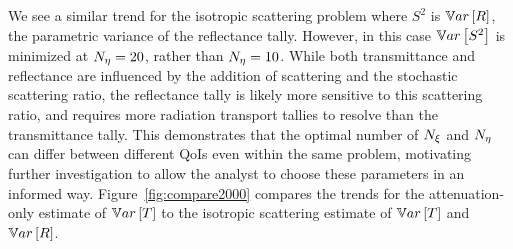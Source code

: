 We see a similar trend for the isotropic scattering problem where $S^2$ is $\mathbb{V}ar\left[R\right]$, the parametric variance of the reflectance tally. However, in this case $\mathbb{V}ar\left[S^2\right]$ is minimized at ${N_\eta}=20$, rather than ${N_\eta}=10$. While both transmittance and reflectance are influenced by the addition of scattering and the stochastic scattering ratio, the reflectance tally is likely more sensitive to this scattering ratio, and requires more radiation transport tallies to resolve than the transmittance tally. This demonstrates that the optimal number of ${N_\xi}$ and ${N_\eta}$ can differ between different QoIs even within the same problem, motivating further investigation to allow the analyst to choose these parameters in an informed way. Figure~\ref{fig:compare2000} compares the trends for the attenuation-only estimate of $\mathbb{V}ar\left[T\right]$ to the isotropic scattering estimate of $\mathbb{V}ar\left[T\right]$ and $\mathbb{V}ar\left[R\right]$. 




